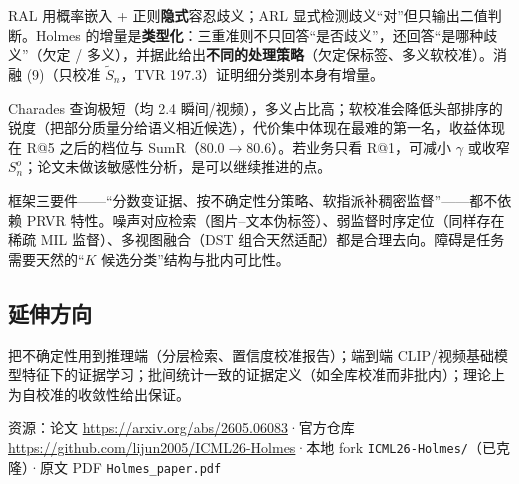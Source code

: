 \documentclass[11pt,a4paper,UTF8,fontset=windows]{ctexart}
\newcommand{\code}[1]{\texttt{#1}}
\newcommand{\term}[1]{\textbf{#1}}
\begin{document}
\begin{thinkbox}
RAL 用概率嵌入 + 正则\term{隐式}容忍歧义；ARL 显式检测歧义“对”但只输出二值判断。Holmes 的增量是\term{类型化}：三重准则不只回答“是否歧义”，还回答“是哪种歧义”（欠定 / 多义），并据此给出\term{不同的处理策略}（欠定保标签、多义软校准）。消融 (9)（只校准 $\tilde S_n$，TVR 197.3）证明细分类别本身有增量。
\end{thinkbox}

\begin{thinkbox}
Charades 查询极短（均 2.4 瞬间/视频），多义占比高；软校准会降低头部排序的锐度（把部分质量分给语义相近候选），代价集中体现在最难的第一名，收益体现在 R@5 之后的档位与 SumR（$80.0\to80.6$）。若业务只看 R@1，可减小 $\gamma$ 或收窄 $S^o_n$；论文未做该敏感性分析，是可以继续推进的点。
\end{thinkbox}

\begin{thinkbox}[Q6：这套框架能迁移到别的任务吗？]
框架三要件——“分数变证据、按不确定性分策略、软指派补稠密监督”——都不依赖 PRVR 特性。噪声对应检索（图片–文本伪标签）、弱监督时序定位（同样存在稀疏 MIL 监督）、多视图融合（DST 组合天然适配）都是合理去向。障碍是任务需要天然的“$K$ 候选分类”结构与批内可比性。
\end{thinkbox}

\subsection{延伸方向}

把不确定性用到推理端（分层检索、置信度校准报告）；端到端 CLIP/视频基础模型特征下的证据学习；批间统计一致的证据定义（如全库校准而非批内）；理论上为自校准的收敛性给出保证。

\vspace{2em}
\begin{center}
\color{inkgray}
资源：论文 \url{https://arxiv.org/abs/2605.06083}\quad·\quad 官方仓库 \url{https://github.com/lijun2005/ICML26-Holmes}\quad·\quad 本地 fork \code{ICML26-Holmes/}（已克隆）\quad·\quad 原文 PDF \code{Holmes\_paper.pdf}
\end{center}

\label{LastPage}
\end{document}
